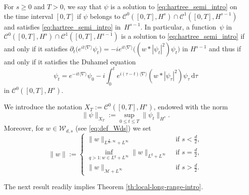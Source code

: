 \documentclass[12pt]{article}
\newcommand{\jnabla}{{\langle\nabla\rangle}}
\theoremstyle{plain}
\newcommand{\meas}{\mathcal{M}}
\begin{document}
    For $s\ge0$ and $T>0$, we say that $\psi$ is a solution to \eqref{eq:hartree_semi_intro}  on the time interval $[0,T]$ if $\psi$ belongs to $\mathcal{C}^{0}([0,T],H^{s})\cap \mathcal{C}^{1}([0,T],H^{s-1})$ and  satisfies \eqref{eq:hartree_semi_intro} in~$H^{s-1}$.
        In particular, a function~$\psi$ in $\mathcal{C}^{0}([0,T],H^{s})\cap \mathcal{C}^{1}([0,T],H^{s-1})$ is a solution to \eqref{eq:hartree_semi_intro}  if and only if it satisfies $\partial_t\big(e^{it \jnabla}\psi_t\big)=-ie^{it \jnabla}\big((w*|\psi_t|^2)\psi_t\big)$ in $H^{s-1}$ and thus if and only if it satisfies the Duhamel equation
\begin{equation}
\psi_{t}=e^{-it\langle\nabla\rangle}\psi_{0}-i\int_{0}^{t}e^{i(\tau-t)\langle\nabla\rangle}(w*|\psi_\tau|^{2})\psi_\tau\,\mathrm{d}\tau\label{eq:Hartree-Duhamel}
\end{equation}
in $\mathcal{C}^0([0,T],H^s)$.


We introduce the notation $X_T:=\mathcal{C}^0([0,T],H^s)$, endowed with the norm	
	\[
\|\psi\|_{X_{T}}:=\sup_{0\leq t\leq T}\|\psi_{t}\|_{H^s}.
\]
Moreover, for $w\in\mathcal{W}_{d,s}$ (see \eqref{eq:def_Wds}) we set
\begin{equation}
\|w\|:=
\begin{cases}
    \|w\|_{L^{\frac{d}{2s},\infty}+L^\infty} &\text{ if } s<\frac{d}{2},\\
     \inf_{q>1:w\in L^q+L^\infty}\|w\|_{L^q+L^\infty} &\text{ if } s= \frac{d}{2},\\
    \|w\|_{\meas+L^\infty} & \text{ if } s> \frac{d}{2}.
\end{cases}
\end{equation}





The next result readily implies Theorem \ref{th:local-long-range-intro}.
\end{document}
